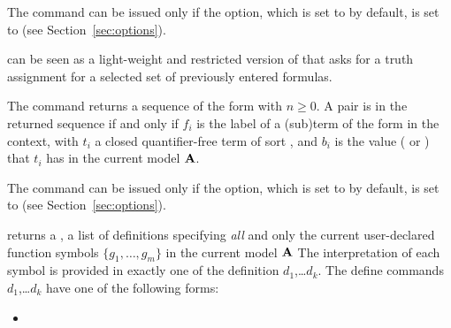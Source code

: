\begin{description}
The command can be issued only if the  option,
which is set to  by default, is set to  
(see Section~\ref{sec:options}).
\smallskip

%
\item[\expr{(get-assignment)}]
can be seen as a light-weight and restricted version of  
that asks for a truth assignment for a selected set 
of previously entered formulas.

The command returns a sequence of the form 
 with $n \geq 0$.
A pair  is in the returned sequence if and only if
$f_i$ is the label of a (sub)term of the form 
 in the context, 
with $t_i$ a closed quantifier-free term of sort ,
and 
$b_i$ is the value ( or ) 
that $t_i$ has in the current model $\mathbf{A}$.

The command can be issued only if the  option, 
which is set to  by default, is set to  
(see Section~\ref{sec:options}).  
\smallskip


%
\item[\expr{(get-model)}]
returns a , 
a list  of definitions specifying \emph{all} and only the current user-declared 
function symbols $\{g_1, \ldots, g_m\}$ in the current model $\mathbf{A}$
The interpretation of each symbol is provided in exactly one of the definition 
$d_1$,\dots $d_k$.  The define commands $d_1$,\dots $d_k$ have one of the following forms:
%
\begin{itemize}
\item
{}


\end{itemize}
\end{description}
